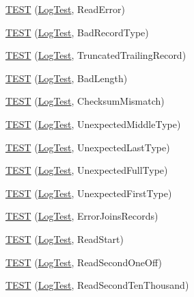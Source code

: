 \begin{DoxyCompactItemize}
\item 
\hyperlink{namespaceleveldb_1_1log_a47ffd653cde9cb9bc00c0a9914da48fd}{T\-E\-S\-T} (\hyperlink{classleveldb_1_1log_1_1_log_test}{Log\-Test}, Read\-Error)
\item 
\hyperlink{namespaceleveldb_1_1log_a4fd335e6dbc3a27ea10e985387f69d6d}{T\-E\-S\-T} (\hyperlink{classleveldb_1_1log_1_1_log_test}{Log\-Test}, Bad\-Record\-Type)
\item 
\hyperlink{namespaceleveldb_1_1log_aab1ee21bc512e6a9415ee8170d14dfce}{T\-E\-S\-T} (\hyperlink{classleveldb_1_1log_1_1_log_test}{Log\-Test}, Truncated\-Trailing\-Record)
\item 
\hyperlink{namespaceleveldb_1_1log_a024a8bc0f558ffe46b3a15ab43018402}{T\-E\-S\-T} (\hyperlink{classleveldb_1_1log_1_1_log_test}{Log\-Test}, Bad\-Length)
\item 
\hyperlink{namespaceleveldb_1_1log_a2dccd9d88a61eb0f59fdea07edfe2022}{T\-E\-S\-T} (\hyperlink{classleveldb_1_1log_1_1_log_test}{Log\-Test}, Checksum\-Mismatch)
\item 
\hyperlink{namespaceleveldb_1_1log_ae2aa67608715051976e4cbb2008e3b52}{T\-E\-S\-T} (\hyperlink{classleveldb_1_1log_1_1_log_test}{Log\-Test}, Unexpected\-Middle\-Type)
\item 
\hyperlink{namespaceleveldb_1_1log_ad618b3ff1dc35a8641c019d8eb4a4e8b}{T\-E\-S\-T} (\hyperlink{classleveldb_1_1log_1_1_log_test}{Log\-Test}, Unexpected\-Last\-Type)
\item 
\hyperlink{namespaceleveldb_1_1log_a178460e2ee7a665f0aef08a28217a6d3}{T\-E\-S\-T} (\hyperlink{classleveldb_1_1log_1_1_log_test}{Log\-Test}, Unexpected\-Full\-Type)
\item 
\hyperlink{namespaceleveldb_1_1log_a7c8a46287bbb1e185ccfcb78c5ae94e3}{T\-E\-S\-T} (\hyperlink{classleveldb_1_1log_1_1_log_test}{Log\-Test}, Unexpected\-First\-Type)
\item 
\hyperlink{namespaceleveldb_1_1log_a2ea9cc0af9f5d8b6bdc74e3126bd389a}{T\-E\-S\-T} (\hyperlink{classleveldb_1_1log_1_1_log_test}{Log\-Test}, Error\-Joins\-Records)
\item 
\hyperlink{namespaceleveldb_1_1log_a6ee7068a33cb134e26e7d1cf58327064}{T\-E\-S\-T} (\hyperlink{classleveldb_1_1log_1_1_log_test}{Log\-Test}, Read\-Start)
\item 
\hyperlink{namespaceleveldb_1_1log_af9cc8dffe50b0cefff163fdca58d1a08}{T\-E\-S\-T} (\hyperlink{classleveldb_1_1log_1_1_log_test}{Log\-Test}, Read\-Second\-One\-Off)
\item 
\hyperlink{namespaceleveldb_1_1log_ab734bca6b78216dc41b112075258dbe7}{T\-E\-S\-T} (\hyperlink{classleveldb_1_1log_1_1_log_test}{Log\-Test}, Read\-Second\-Ten\-Thousand)

\end{DoxyCompactItemize}
